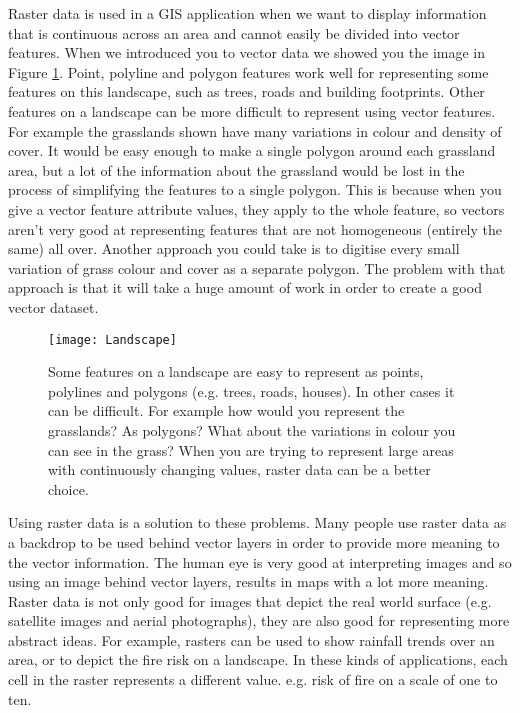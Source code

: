 Raster data is used in a GIS application when we want to display information
that is continuous across an area and cannot easily be divided into vector
features. When we introduced you to vector data we showed you the image in
Figure \ref{fig:landfeatures}. Point, polyline and polygon features work well for
representing some features on this landscape, such as trees, roads and
building footprints. Other features on a landscape can be more difficult to
represent using vector features. For example the grasslands shown have many
variations in colour and density of cover. It would be easy enough to make a
single polygon around each grassland area, but a lot of the information about
the grassland would be lost in the process of simplifying the features to a
single polygon. This is because when you give a vector feature attribute
values, they apply to the whole feature, so vectors aren't very good at
representing features that are not homogeneous (entirely the same) all over.
Another approach you could take is to digitise every small variation of grass
colour and cover as a separate polygon. The problem with that approach is
that it will take a huge amount of work in order to create a good vector
dataset. 

\begin{figure}[ht]
   \begin{center}
   \caption{Some features on a landscape are easy to represent as points,
polylines and polygons (e.g. trees, roads, houses). In other cases it can be
difficult. For example how would you represent the grasslands? As polygons?
What about the variations in colour you can see in the grass? When you are
trying to represent large areas with continuously changing values, raster
data can be a better choice.}
\label{fig:landfeatures}\smallskip
   \texttt{[image: Landscape]}
\end{center}
\end{figure}

Using raster data is a solution to these problems. Many people use raster
data as a backdrop to be used behind vector layers in order to provide more
meaning to the vector information. The human eye is very good at interpreting
images and so using an image behind vector layers, results in maps with a lot
more meaning. Raster data is not only good for images that depict the real
world surface (e.g. satellite images and aerial photographs), they are also
good for representing more abstract ideas. For example, rasters can be used
to show rainfall trends over an area, or to depict the fire risk on a
landscape. In these kinds of applications, each cell in the raster represents
a different value. e.g. risk of fire on a scale of one to ten.

